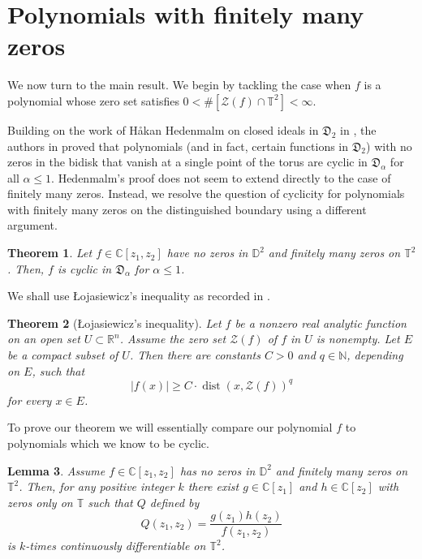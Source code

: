 \documentclass[11 pt,reqno]{amsart}
\newtheorem{thm}{Theorem}[section]
\newtheorem{lem}[thm]{Lemma}
\theoremstyle{definition}
\theoremstyle{remark}
\numberwithin{equation}{section} \numberwithin{figure}{section}
\begin{document}
\section{Polynomials with finitely many zeros}\label{finitezeros}
We now turn to the main result. We begin by tackling the case when $f$ is a polynomial whose zero set satisfies $0 < \#[\mathcal{Z}(f)\cap \mathbb{T}^2]<\infty$.

Building on the work of H\aa kan Hedenmalm on closed ideals in $\mathfrak{D}_2$ in \cite{Hed88}, the authors in \cite{BCLSS13II} proved that polynomials (and in fact, certain functions in $\mathfrak{D}_2$) with no zeros in the bidisk that vanish at a single point of  the torus are cyclic in $\mathfrak{D}_{\alpha}$ for all $\alpha\leq 1$.  Hedenmalm's proof does not seem to extend directly to the case of finitely many zeros.  Instead, we resolve the question
of cyclicity for polynomials with finitely many zeros on the distinguished boundary using a different argument.

\begin{thm} \label{thmfinitezeros}
Let $f \in {{\mathbb C}}[z_1,z_2]$ have no zeros in ${{\mathbb D}}^2$ and finitely many
zeros on ${{\mathbb T}}^2$.  Then, $f$ is cyclic in $\mathfrak{D}_{\alpha}$ for
$\alpha \leq 1$.
\end{thm}

We shall use \L ojasiewicz's inequality as recorded in \cite{KP02}.

\begin{thm}[\L ojasiewicz's inequality]
Let $f$ be a nonzero real analytic function on an open set $U\subset
{{\mathbb R}}^n$.  Assume the zero set $\mathcal{Z}(f)$ of $f$ in $U$ is nonempty. Let $E$ be a compact subset of $U$.  Then there are constants $C >0$
and $q \in {{\mathbb N}}$, depending on $E$, such that
\[
|f(x)| \geq C \cdot \operatorname{dist} (x,\mathcal{Z}(f))^q
\]
for every $x \in E$.
\end{thm}

To prove our theorem we will essentially compare our polynomial $f$ to
polynomials which we know to be cyclic.

\begin{lem}\label{product}
  Assume $f \in {{\mathbb C}}[z_1,z_2]$ has no zeros in ${{\mathbb D}}^2$ and finitely many zeros on ${{\mathbb T}}^2$.
  Then, for any positive integer $k$ there exist $g \in {{\mathbb C}}[z_1]$ and
  $h \in {{\mathbb C}}[z_2]$ with zeros only on ${{\mathbb T}}$ such that $Q$ defined by
\[
Q(z_1,z_2) = \frac{g(z_1)h(z_2)}{f(z_1,z_2)}
\]
is $k$-times continuously differentiable on ${{\mathbb T}}^2$.
\end{lem}
\end{document}
